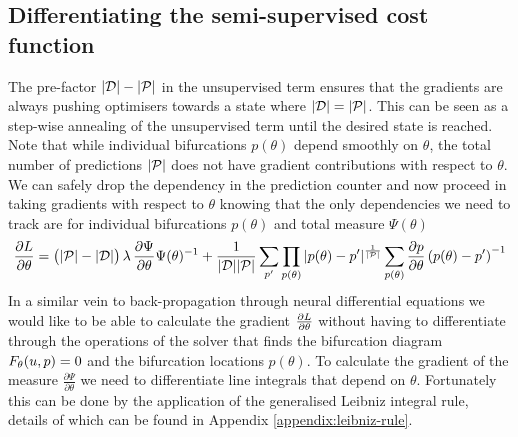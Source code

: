 \subsection{Differentiating the semi-supervised cost function}

The pre-factor $|\mathcal{D}|-|\mathcal{P}|$ in the unsupervised term ensures that the gradients are always pushing optimisers towards a state where $|\mathcal{D}|=|\mathcal{P}|$. This can be seen as a step-wise annealing of the unsupervised term until the desired state is reached. Note that while individual bifurcations $p(\theta)$ depend smoothly on $\theta$, the total number of predictions $|\mathcal{P}|$ does not have gradient contributions with respect to $\theta$. We can safely drop the dependency in the prediction counter and now proceed in taking gradients with respect to $\theta$ knowing that the only dependencies we need to track are for individual bifurcations $p(\theta)$ and total measure $\Psi(\theta)$
\begin{align}
    \frac{\partial L}{\partial\theta}=
    \big(|\mathcal{P}|-|\mathcal{D}|\big)\,\lambda\,
    \frac{\partial \Psi}{\partial\theta}\Psi(\theta)^{-1}+
    \frac{1}{|\mathcal{D}||\mathcal{P}|}\sum_{p'}
    \prod_{p(\theta)}|p(\theta)-p'|^{\frac{1}{|\mathcal{P}|}}
    \sum_{p(\theta)}\frac{\partial p}{\partial\theta}\left(p(\theta)-p'\right)^{-1}
    \label{eq:gradient-loss}
\end{align}
In a similar vein to back-propagation through neural differential equations \cite{Chen2018NeuralEquations} we would like to be able to calculate the gradient $\frac{\partial L}{\partial\theta}$ without having to differentiate through the operations of the solver that finds the bifurcation diagram $F_{\theta}(u,p)=0$ and the bifurcation locations $p(\theta)$. To calculate the gradient of the measure $\frac{\partial \Psi}{\partial\theta}$ we need to differentiate line integrals that depend on $\theta$. Fortunately this can be done by the application of the generalised Leibniz integral rule, details of which can be found in Appendix \ref{appendix:leibniz-rule}.

